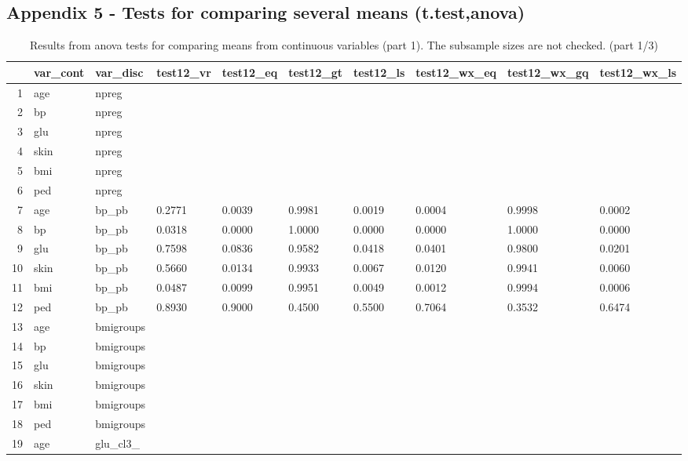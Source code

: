 \documentclass[12pt]{article}
\begin{document}
\begin{landscape}
\section*{Appendix 5 - Tests for comparing several means (t.test,anova)}
\begin{table}[ht]
\centering
\begin{tabular}{rlllllllll}
  \hline
 & var\_cont & var\_disc & test12\_vr & test12\_eq & test12\_gt & test12\_ls & test12\_wx\_eq & test12\_wx\_gq & test12\_wx\_ls \\ 
  \hline
1 & age & npreg &   &   &   &   &   &   &   \\ 
  2 & bp & npreg &   &   &   &   &   &   &   \\ 
  3 & glu & npreg &   &   &   &   &   &   &   \\ 
  4 & skin & npreg &   &   &   &   &   &   &   \\ 
  5 & bmi & npreg &   &   &   &   &   &   &   \\ 
  6 & ped & npreg &   &   &   &   &   &   &   \\ 
  7 & age & bp\_pb & 0.2771 & 0.0039 & 0.9981 & 0.0019 & 0.0004 & 0.9998 & 0.0002 \\ 
  8 & bp & bp\_pb & 0.0318 & 0.0000 & 1.0000 & 0.0000 & 0.0000 & 1.0000 & 0.0000 \\ 
  9 & glu & bp\_pb & 0.7598 & 0.0836 & 0.9582 & 0.0418 & 0.0401 & 0.9800 & 0.0201 \\ 
  10 & skin & bp\_pb & 0.5660 & 0.0134 & 0.9933 & 0.0067 & 0.0120 & 0.9941 & 0.0060 \\ 
  11 & bmi & bp\_pb & 0.0487 & 0.0099 & 0.9951 & 0.0049 & 0.0012 & 0.9994 & 0.0006 \\ 
  12 & ped & bp\_pb & 0.8930 & 0.9000 & 0.4500 & 0.5500 & 0.7064 & 0.3532 & 0.6474 \\ 
  13 & age & bmigroups &   &   &   &   &   &   &   \\ 
  14 & bp & bmigroups &   &   &   &   &   &   &   \\ 
  15 & glu & bmigroups &   &   &   &   &   &   &   \\ 
  16 & skin & bmigroups &   &   &   &   &   &   &   \\ 
  17 & bmi & bmigroups &   &   &   &   &   &   &   \\ 
  18 & ped & bmigroups &   &   &   &   &   &   &   \\ 
  19 & age & glu\_cl3\_ &   &   &   &   &   &   &   \\ 
   \hline
\end{tabular}
\caption{Results from anova tests for comparing means from continuous variables (part 1). The subsample sizes are not checked. (part 1/3)} 
\label{tab:anova.test1.1}
\end{table}
 

\end{landscape}
\end{document}

